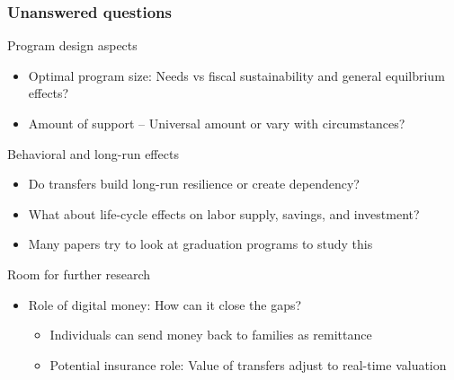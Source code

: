 \documentclass[aspectratio=169]{beamer}
\begin{document}
\begin{frame}
\frametitle{Unanswered questions}
Program design aspects
\begin{itemize}\setlength\itemsep{3pt}
\item Optimal program size: Needs vs fiscal sustainability and general equilbrium effects?
\item Amount of support -- Universal amount or vary with circumstances?
\end{itemize}\medskip
Behavioral and long-run effects
\begin{itemize}\setlength\itemsep{3pt}
\item Do transfers build long-run resilience or create dependency? 
\item What about life-cycle effects on labor supply, savings, and investment?
\item Many papers try to look at graduation programs to study this

\end{itemize}\medskip
Room for further research
\begin{itemize}\setlength\itemsep{3pt}
\item Role of digital money: How can it close the gaps?
\begin{itemize}\setlength\itemsep{3pt}
  \item Individuals can send money back to families as remittance
  \item Potential insurance role: Value of transfers adjust to real-time valuation
\end{itemize}

\end{itemize}
\end{frame}



\end{document}
